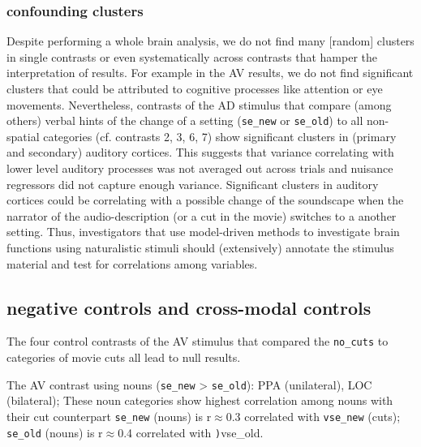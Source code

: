 \documentclass[english]{article}
\begin{document}
\subsubsection{confounding clusters}
Despite performing a whole brain analysis, we do not find many [random] clusters
in single contrasts or even systematically across contrasts that hamper the
interpretation of results.
For example in the AV results, we do not find significant clusters that could be
attributed to cognitive processes like attention or eye movements.
Nevertheless, contrasts of the AD stimulus that compare (among others) verbal
hints of the change of a setting (\texttt{se\_new} or \texttt{se\_old}) to all
non-spatial categories (cf. contrasts 2, 3, 6, 7) show significant clusters in
(primary and secondary) auditory cortices.
This suggests that variance correlating with lower level auditory processes was
not averaged out across trials and nuisance regressors did not capture enough
variance.
Significant clusters in auditory cortices could be correlating with a possible
change of the soundscape when the narrator of the audio-description (or a cut in
the movie) switches to a another setting.
Thus, investigators that use model-driven methods to investigate brain functions
using naturalistic stimuli should (extensively) annotate the stimulus material
and test for correlations among variables.

\subsection{negative controls and cross-modal controls}


The four control contrasts of the AV stimulus that compared the
\texttt{no\_cuts} to categories of movie cuts all lead to null results.

The AV contrast using nouns (\texttt{se\_new} > \texttt{se\_old}): PPA
(unilateral), LOC (bilateral); These noun categories show highest correlation
among nouns with their cut counterpart \texttt{se\_new} (nouns) is r$\approx$0.3
correlated with \texttt{vse\_new} (cuts); \texttt{se\_old} (nouns) is
r$\approx$0.4 correlated with \texttt){vse\_old}.
\end{document}
